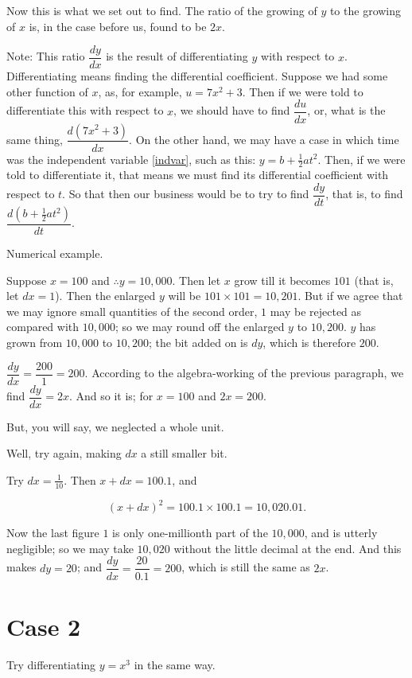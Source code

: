 \documentclass{ximera}
\begin{document}
Now this is what we set out to find. The ratio of the growing of $y$ to the growing of $x$ is, in the case
before us, found to be $2x$.

Note: This ratio $\dfrac{dy}{dx}$ is the result of differentiating $y$ with respect to $x$. Differentiating means finding the differential coefficient. Suppose we had some other function of $x$, as, for example, $u = 7x^2 + 3$. Then if we were told to differentiate this with respect to $x$, we should have to find $\dfrac{du}{dx}$, or, what is the same thing, $\dfrac{d(7x^2 + 3)}{dx}$. On the other hand, we may have a case in which time was the independent variable \ref{indvar}, such as this: $y = b + \frac{1}{2} at^2$. Then, if we were told to differentiate it, that means we must find its differential coefficient with respect to $t$. So that then our business would be to try to find $\dfrac{dy}{dt}$, that is, to find $\dfrac{d(b + \frac{1}{2} at^2)}{dt}$.

Numerical example.

Suppose $x=100$ and $\therefore y=10,000$. Then let $x$ grow till it becomes $101$ (that is, let $dx=1$). Then the enlarged $y$ will be $101 \times 101 = 10,201$. But if we agree that we may ignore small quantities of the second order, $1$ may be rejected as compared with $10,000$; so we may round off the enlarged $y$ to $10,200$. $y$ has grown from $10,000$ to $10,200$; the bit added on is $dy$, which is therefore $200$.

$\dfrac{dy}{dx} = \dfrac{200}{1} = 200$. According to the algebra-working of the previous paragraph, we find $\dfrac{dy}{dx} = 2x$. And so it is; for $x=100$ and $2x=200$.

But, you will say, we neglected a whole unit.

Well, try again, making $dx$ a still smaller bit.

Try $dx=\frac{1}{10}$. Then $x+dx=100.1$, and

\[ (x+dx)^2 = 100.1 \times 100.1 = 10,020.01. \]

Now the last figure $1$ is only one-millionth part of the $10,000$, and is utterly negligible; so we may take $10,020$ without the little decimal at the end. And this makes $dy=20$; and $\dfrac{dy}{dx} = \dfrac{20}{0.1} = 200$, which is still the same as $2x$.

\section*{Case 2}
Try differentiating $y = x^3$ in the same way.
\end{document}

